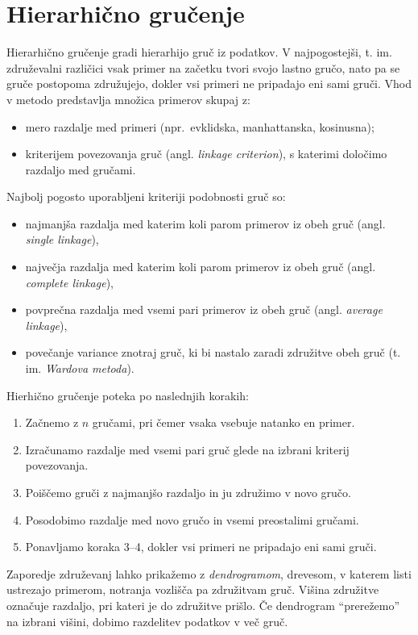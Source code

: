 \section{Hierarhično gručenje}

Hierarhično gručenje gradi hierarhijo gruč iz podatkov. V najpogostejši, t. im. združevalni različici vsak primer na začetku tvori
svojo lastno gručo, nato pa se gruče postopoma združujejo, dokler vsi primeri
ne pripadajo eni sami gruči. Vhod v metodo predstavlja množica primerov skupaj z:
\begin{itemize}
\item mero razdalje med primeri (npr.\ evklidska, manhattanska, kosinusna);
\item kriterijem povezovanja gruč (angl. {\em linkage criterion}), s katerimi določimo razdaljo med gručami.
\end{itemize}
%
Najbolj pogosto uporabljeni kriteriji podobnosti gruč so:
\begin{itemize}
\item najmanjša razdalja med katerim koli parom primerov
      iz obeh gruč (angl. {\em single linkage}),
\item največja razdalja med katerim koli parom primerov
      iz obeh gruč (angl. {\em complete linkage}),
\item povprečna razdalja med vsemi pari primerov
      iz obeh gruč (angl. {\em average linkage}),
\item povečanje variance znotraj gruč, ki bi nastalo
      zaradi združitve obeh gruč (t. im. {\em Wardova metoda}).
\end{itemize}

Hierhično gručenje poteka po naslednjih korakih:
\begin{enumerate}
\item Začnemo z $n$ gručami, pri čemer vsaka vsebuje natanko en primer.
\item Izračunamo razdalje med vsemi pari gruč glede na izbrani kriterij povezovanja.
\item Poiščemo gruči z najmanjšo razdaljo in ju združimo v novo gručo.
\item Posodobimo razdalje med novo gručo in vsemi preostalimi gručami.
\item Ponavljamo koraka 3--4, dokler vsi primeri ne pripadajo eni sami gruči.
\end{enumerate}

Zaporedje združevanj lahko prikažemo z {\em dendrogramom}, drevesom, v katerem listi ustrezajo primerom, notranja vozlišča pa združitvam gruč. Višina združitve označuje razdaljo, pri kateri je do združitve prišlo. Če dendrogram ``prerežemo'' na izbrani višini, dobimo razdelitev podatkov v več gruč.

